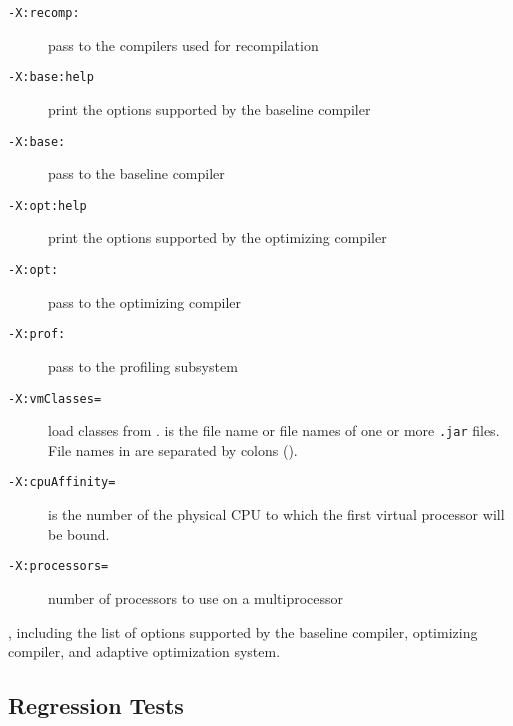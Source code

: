 \begin{description}
\item[{\tt -X:recomp:}]
pass  to the compilers used for recompilation

\item[{\tt -X:base\Mlsq{}:help\Mrsq{}}]
print the options supported by the baseline compiler

\item[{\tt -X:base:}]
pass  to the baseline compiler

\item[{\tt -X:opt\Mlsq{}:help\Mrsq{}}]
print the options supported by the optimizing compiler

\item[{\tt -X:opt:}]
pass  to the optimizing compiler

\item[{\tt -X:prof:}]
pass  to the profiling subsystem

\item[{\tt -X:vmClasses=}]
load classes from .   is the file name or
file names of one or more {\tt .jar} files.  File names in
 are separated by colons (\Mlitch{:}).

\item[{\tt -X:cpuAffinity=}]
 is the number of the physical CPU to which the first virtual processor will be bound.

\item[{\tt -X:processors=\Mlsq{}  \Mor{}  \Mrsq{}}]
number of processors to use on a multiprocessor

\end{description}

, including the list of options supported by the baseline
compiler, optimizing compiler, and adaptive optimization system. 

\subsection{Regression Tests}
\label{sec:regression}


